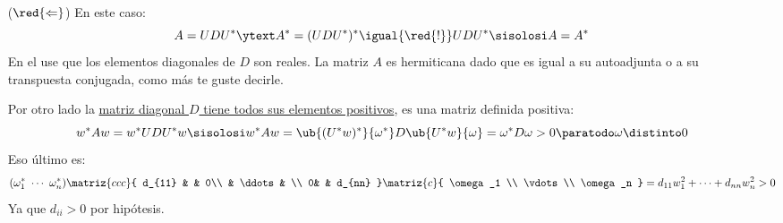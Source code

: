 \begin{itemize}
  \item[($\red{\Leftarrow}$)]
        En este caso:
        $$
          A = UDU^*
          \ytext
          A^* = (UDU^*)^*
          \igual{\red{!}}
          UDU^*
          \sisolosi
          A = A^*
        $$
        En el \red{!} use que los elementos diagonales de $D$ son reales. La matriz $A$ es hermiticana dado que es
        igual a su autoadjunta o a su transpuesta conjugada, como más te guste decirle.

        Por otro lado la \ul{matriz diagonal $D$ tiene todos sus elementos positivos}, es una matriz definida positiva:
        $$
          w^* A w = w^* U D U^* w
          \sisolosi
          w^* A w =
          \ub{
            (U^* w)^*
          }{
            \omega^*
          } D
          \ub{
            U^* w
          }{
            \omega
          } = \omega^* D \omega > 0 \paratodo \omega \distinto 0
        $$
        Eso último es:
        $$
          (\omega_1^*\ \cdots \ \omega_n^*)
          \matriz{ccc}{
            d_{11} & & 0\\
            & \ddots & \\
            0&  & d_{nn}
          }
          \matriz{c}{
            \omega_1 \\
            \vdots\\
            \omega_n
          }
          = 
          d_{11} w^2_1 +
          \cdots + 
          d_{nn} w^2_n > 0
        $$
        Ya que $d_{ii} > 0$ por hipótesis.
\end{itemize}
